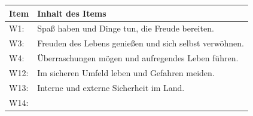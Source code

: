 \documentclass[12pt,ngerman,]{book}
\begin{document}
\begin{longtable}[]{@{}ll@{}}
\toprule
\begin{minipage}[b]{0.08\columnwidth}\raggedright\strut
Item\strut
\end{minipage} & \begin{minipage}[b]{0.86\columnwidth}\raggedright\strut
Inhalt des Items\strut
\end{minipage}\tabularnewline
\midrule
\endhead
\begin{minipage}[t]{0.08\columnwidth}\raggedright\strut
W1:\strut
\end{minipage} & \begin{minipage}[t]{0.86\columnwidth}\raggedright\strut
Spaß haben und Dinge tun, die Freude bereiten.\strut
\end{minipage}\tabularnewline
\begin{minipage}[t]{0.08\columnwidth}\raggedright\strut
W3:\strut
\end{minipage} & \begin{minipage}[t]{0.86\columnwidth}\raggedright\strut
Freuden des Lebens genießen und sich selbst verwöhnen.\strut
\end{minipage}\tabularnewline
\begin{minipage}[t]{0.08\columnwidth}\raggedright\strut
W4:\strut
\end{minipage} & \begin{minipage}[t]{0.86\columnwidth}\raggedright\strut
Überraschungen mögen und aufregendes Leben führen.\strut
\end{minipage}\tabularnewline
\begin{minipage}[t]{0.08\columnwidth}\raggedright\strut
W12:\strut
\end{minipage} & \begin{minipage}[t]{0.86\columnwidth}\raggedright\strut
Im sicheren Umfeld leben und Gefahren meiden.\strut
\end{minipage}\tabularnewline
\begin{minipage}[t]{0.08\columnwidth}\raggedright\strut
W13:\strut
\end{minipage} & \begin{minipage}[t]{0.86\columnwidth}\raggedright\strut
Interne und externe Sicherheit im Land.\strut
\end{minipage}\tabularnewline
\begin{minipage}[t]{0.08\columnwidth}\raggedright\strut
W14:\strut
\end{minipage} & \begin{minipage}[t]{0.86\columnwidth}\raggedright\strut

\end{minipage}
\end{longtable}
\end{document}
